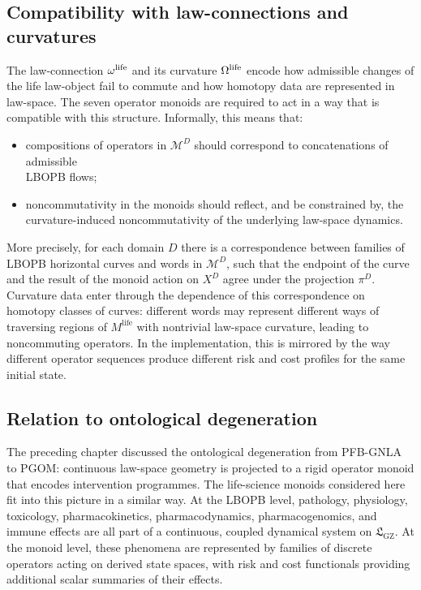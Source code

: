 \documentclass[11pt]{book}
\theoremstyle{plain}
\theoremstyle{definition}
\theoremstyle{remark}
\newcommand{\GZLS}{\ensuremath{\mathfrak{L}_{\mathrm{GZ}}}}       \newcommand{\GZLT}{\ensuremath{M_{!w}}}                           \newcommand{\GZLOC}{\ensuremath{A_M}}                             \newcommand{\GZLCurv}{\ensuremath{\mathcal{F}_{\mathrm{law}}}}
\begin{document}
\subsection*{Compatibility with law-connections and curvatures}

The law-connection $\omega^{\mathrm{life}}$ and its curvature
$\Omega^{\mathrm{life}}$ encode how admissible changes of the life
law-object fail to commute and how homotopy data are represented in
law-space. The seven operator monoids are required to act in a way
that is compatible with this structure. Informally, this means that:
\begin{itemize}
  \item compositions of operators in $\mathcal{M}^{D}$ should correspond
        to concatenations of admissible \\LBOPB flows;
  \item noncommutativity in the monoids should reflect, and be
        constrained by, the curvature-induced noncommutativity of
        the underlying law-space dynamics.
\end{itemize}

More precisely, for each domain $D$ there is a correspondence between
families of LBOPB horizontal curves and words in $\mathcal{M}^{D}$,
such that the endpoint of the curve and the result of the monoid
action on $X^{D}$ agree under the projection $\pi^{D}$. Curvature data
enter through the dependence of this correspondence on homotopy
classes of curves: different words may represent different ways of
traversing regions of $M^{\mathrm{life}}$ with nontrivial law-space
curvature, leading to noncommuting operators. In the implementation,
this is mirrored by the way different operator sequences produce
different risk and cost profiles for the same initial state.

\subsection*{Relation to ontological degeneration}

The preceding chapter discussed the ontological degeneration from
PFB-GNLA to PGOM: continuous law-space geometry is projected to a
rigid operator monoid that encodes intervention programmes. The
life-science monoids considered here fit into this picture in a
similar way. At the LBOPB level, pathology, physiology, toxicology,
pharmacokinetics, pharmacodynamics, pharmacogenomics, and immune
effects are all part of a continuous, coupled dynamical system on
$\GZLS$. At the monoid level, these phenomena are represented by
families of discrete operators acting on derived state spaces, with
risk and cost functionals providing additional scalar summaries of
their effects.
\end{document}
